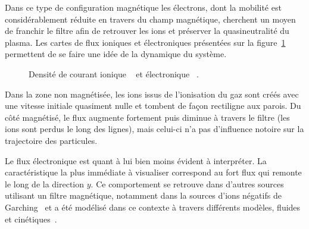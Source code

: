 \begin{refsection}
Dans ce type de configuration
magnétique les électrons, dont la mobilité est considérablement réduite en
travers du champ magnétique, cherchent un moyen de franchir le filtre afin de
retrouver les ions et préserver la quasineutralité du plasma. Les cartes de flux
ioniques et électroniques présentées sur la figure~\ref{4-PegasesCarteFlux}
permettent de se faire une idée de la dynamique du système. 

\begin{figure}[!htbp]
  \centering
    \caption{Densité de courant ionique ~
    et électronique ~.}
    \label{4-PegasesCarteFlux}
\end{figure}

Dans la zone non
magnétisée, les ions issus de l'ionisation du gaz sont créés avec une vitesse
initiale quasiment nulle et tombent de façon rectiligne aux parois. Du côté
magnétisé, le flux augmente fortement puis diminue à travers le filtre (les
ions sont perdus le long des lignes), mais celui-ci n'a pas d'influence notoire sur la trajectoire des particules.

Le flux électronique est quant à lui bien moins évident à interpréter. La
caractéristique la plus immédiate à visualiser correspond au fort flux qui
remonte le long de la direction $y$. Ce comportement se retrouve dans d'autres
sources utilisant un filtre magnétique, notamment dans la
sources d'ions négatifs de Garching~\parencite{Fantz} et a été modélisé
dans ce contexte à travers différents
modèles, fluides et cinétiques~\parencite{PIC2D,PIC3D,MAGMA}. 


\end{refsection}
